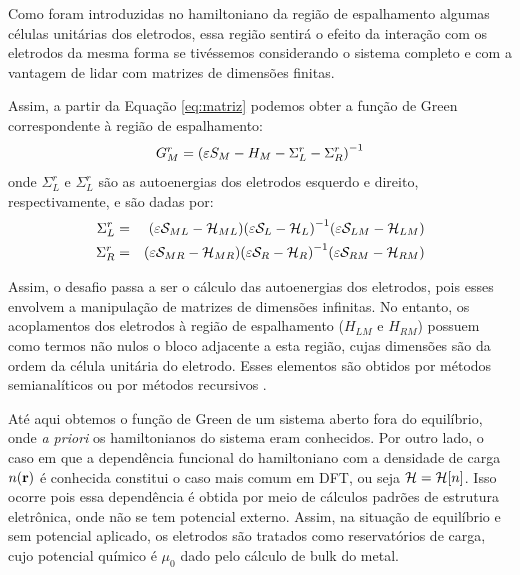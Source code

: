 Como foram introduzidas no hamiltoniano da região de espalhamento algumas células unitárias dos eletrodos, essa região sentirá o efeito da interação com os eletrodos da mesma forma se tivéssemos considerando o sistema completo e com a vantagem de lidar com matrizes de dimensões finitas.

Assim, a partir da Equação \eqref{eq:matriz} podemos obter a função de Green correspondente à região de espalhamento:
\begin{equation}\label{eq:green}
    G_M^r=\pqty{\varepsilon S_M-H_M-\Sigma^{r}_L-\Sigma^{r}_R}^{-1}
\end{equation}
onde $\Sigma^{r}_L$ e $\Sigma^{r}_L$ são as autoenergias dos eletrodos esquerdo e direito, respectivamente, e são dadas por:
\begin{eqnarray}\label{eq:auto1}
\Sigma^{r}_L&=&\pqty{\varepsilon \mathcal{S}_{ML}-\mathcal{H}_{ML}}\pqty{\varepsilon \mathcal{S}_{L}-\mathcal{H}_{L}}^{-1}\pqty{\varepsilon \mathcal{S}_{LM}-\mathcal{H}_{LM}}\\\label{eq:auto2}
\Sigma^{r}_R&=&\pqty{\varepsilon \mathcal{S}_{MR}-\mathcal{H}_{MR}}\pqty{\varepsilon \mathcal{S}_{R}-\mathcal{H}_{R}}^{-1}\pqty{\varepsilon \mathcal{S}_{RM}-\mathcal{H}_{RM}}
\end{eqnarray}

Assim, o desafio passa a ser o cálculo das autoenergias dos eletrodos, pois esses envolvem a manipulação de matrizes de dimensões infinitas. No entanto, os acoplamentos dos eletrodos à região de espalhamento ($H_{LM}$ e $H_{RM}$) possuem como termos não nulos o bloco adjacente a esta região, cujas dimensões são da ordem da célula unitária do eletrodo. Esses elementos são obtidos por métodos semianalíticos ou por métodos recursivos \cite{smeagol1,smeagol2}. 

Até aqui obtemos o função de Green de um sistema aberto fora do equilíbrio, onde \textit{a priori} os hamiltonianos do sistema eram conhecidos. Por outro lado, o caso em que a dependência funcional do hamiltoniano com a densidade de carga $n(\vb{r})$ é conhecida constitui o caso mais comum em DFT, ou seja $\mathcal{H}=\mathcal{H}\bqty{n}$. Isso ocorre pois essa dependência é obtida por meio de cálculos padrões de estrutura eletrônica, onde não se tem potencial externo. Assim, na situação de equilíbrio e sem potencial aplicado, os eletrodos são tratados como reservatórios de carga, cujo potencial químico é $\mu_0$ dado pelo cálculo de bulk do metal.

